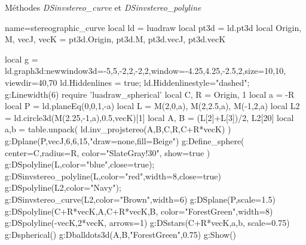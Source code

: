 \begin{demo}{Méthodes \emph{DSinvstereo\_curve} et \emph{DSinvstereo\_polyline}}
\begin{luadraw}{name=stereographic_curve}
local ld = luadraw
local pt3d = ld.pt3d
local Origin, M, vecJ, vecK = pt3d.Origin, pt3d.M, pt3d.vecJ, pt3d.vecK

local g = ld.graph3d:new{window3d={-5,5,-2,2,-2,2},window={-4.25,4.25,-2.5,2},size={10,10}, viewdir={40,70}}
ld.Hiddenlines = true; ld.Hiddenlinestyle="dashed"; g:Linewidth(6)
require 'luadraw_spherical'
local C, R = Origin, 1
local a = -R
local P = ld.planeEq(0,0,1,-a)
local L = {M(2,0,a), M(2,2.5,a), M(-1,2,a)}
local L2 = ld.circle3d(M(2.25,-1,a),0.5,vecK)[1]
local A, B = (L[2]+L[3])/2, L2[20]
local a,b = table.unpack( ld.inv_projstereo({A,B},{C,R},C+R*vecK) )
g:Dplane(P,vecJ,6,6,15,"draw=none,fill=Beige")
g:Define_sphere( {center=C,radius=R, color="SlateGray!30", show=true} )
g:DSpolyline(L,{color="blue",close=true}); g:DSinvstereo_polyline(L,{color="red",width=8,close=true})
g:DSpolyline(L2,{color="Navy"}); g:DSinvstereo_curve(L2,{color="Brown",width=6})
g:DSplane(P,{scale=1.5})
g:DSpolyline({{C+R*vecK,A},{C+R*vecK,B}}, {color="ForestGreen",width=8})
g:DSpolyline({{-vecK,2*vecK}}, {arrows=1})
g:DSstars({C+R*vecK,a,b}, {scale=0.75})
g:Dspherical()
g:Dballdots3d({A,B},"ForestGreen",0.75)
g:Show()
\end{luadraw}
\end{demo}
